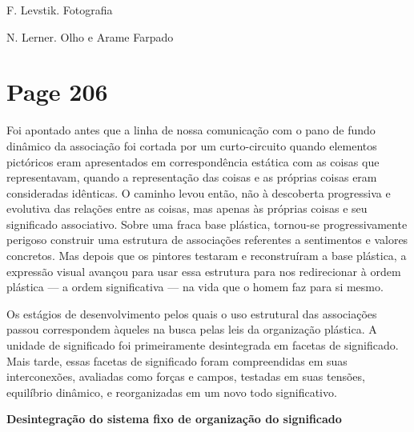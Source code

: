 \documentclass[a4paper]{article}
\begin{document}
\centering
F. Levstik. Fotografia

\vspace*{25\baselineskip}

\centering
N. Lerner. Olho e Arame Farpado

\vfill


\newpage
\section*{Page 206}

Foi apontado antes que a linha de nossa comunicação com o pano de fundo dinâmico da associação foi cortada por um curto-circuito quando elementos pictóricos eram apresentados em correspondência estática com as coisas que representavam, quando a representação das coisas e as próprias coisas eram consideradas idênticas. O caminho levou então, não à descoberta progressiva e evolutiva das relações entre as coisas, mas apenas às próprias coisas e seu significado associativo. Sobre uma fraca base plástica, tornou-se progressivamente perigoso construir uma estrutura de associações referentes a sentimentos e valores concretos. Mas depois que os pintores testaram e reconstruíram a base plástica, a expressão visual avançou para usar essa estrutura para nos redirecionar à ordem plástica --- a ordem significativa --- na vida que o homem faz para si mesmo.

Os estágios de desenvolvimento pelos quais o uso estrutural das associações passou correspondem àqueles na busca pelas leis da organização plástica. A unidade de significado foi primeiramente desintegrada em facetas de significado. Mais tarde, essas facetas de significado foram compreendidas em suas interconexões, avaliadas como forças e campos, testadas em suas tensões, equilíbrio dinâmico, e reorganizadas em um novo todo significativo.

\textbf{Desintegração do sistema fixo de organização do significado}
\end{document}

